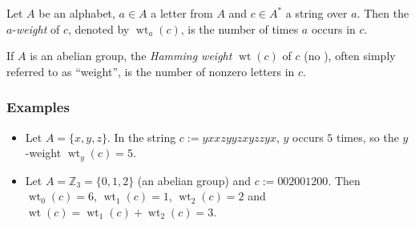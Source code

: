 \documentclass[12pt]{article}
\newcommand{\mbb}{\mathbb}
\DeclareMathOperator{\wt}{wt}
\begin{document}
Let $A$ be an alphabet, $a\in A$ a letter from $A$ and $c\in A^*$ a
string over $a$. Then the $a$-\emph{weight} of $c$, denoted by
$\wt_a(c)$, is the number of times $a$ occurs in $c$.

If $A$ is an abelian group, the \emph{Hamming weight} $\wt(c)$ of $c$ (no ),
often simply referred to as ``weight'', is the number of nonzero letters in $c$.

\subsubsection*{Examples}

\begin{itemize}
\item Let $A=\{x,y,z\}$. In the string $c:=yxxzyyzxyzzyx$, $y$ occurs $5$
  times, so the $y$-weight $\wt_y(c)=5$.
\item Let $A=\mbb{Z}_3=\{0,1,2\}$ (an abelian group) and
  $c:=002001200$. Then $\wt_0(c)=6$, $\wt_1(c)=1$, $\wt_2(c)=2$ and
  $\wt(c)=\wt_1(c)+\wt_2(c)=3$.
\end{itemize}
\end{document}
